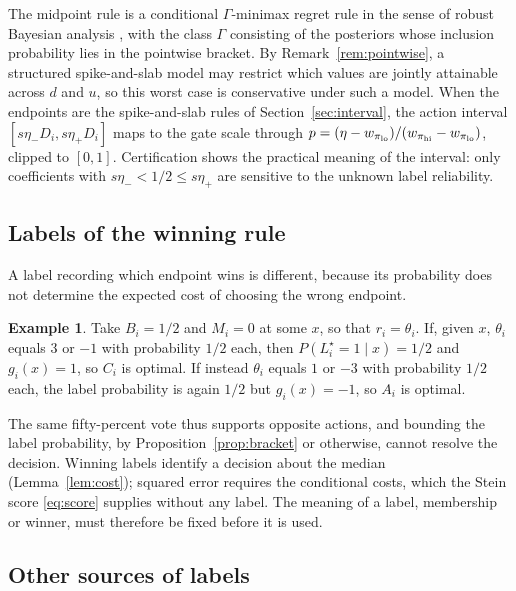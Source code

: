 \documentclass[11pt]{article}
\theoremstyle{plain}
\theoremstyle{definition}
\newtheorem{example}{Example}
\theoremstyle{remark}
\begin{document}
The midpoint rule is a conditional $\Gamma$-minimax regret rule in the sense of robust
Bayesian analysis \citep{berger1985statistical,vidakovic2000gamma}, with the class $\Gamma$
consisting of the posteriors whose inclusion probability lies in the pointwise bracket. By
Remark~\ref{rem:pointwise}, a structured spike-and-slab model may restrict which values are
jointly attainable across $d$ and $u$, so this worst case is conservative under such a model. When the
endpoints are the spike-and-slab rules of Section~\ref{sec:interval}, the action interval
$[s\eta_-D_i,s\eta_+D_i]$ maps to the gate scale through
$p=(\eta-w_{\pi_{\rm lo}})/(w_{\pi_{\rm hi}}-w_{\pi_{\rm lo}})$, clipped to $[0,1]$.
Certification shows the practical meaning of the interval: only coefficients with
$s\eta_-<1/2\le s\eta_+$ are sensitive to the unknown label reliability.

\subsection{Labels of the winning rule}

A label recording which endpoint wins is different, because its probability does not
determine the expected cost of choosing the wrong endpoint.

\begin{example}\label{ex:votes}
Take $B_i=1/2$ and $M_i=0$ at some $x$, so that $r_i=\theta_i$. If, given $x$, $\theta_i$
equals $3$ or $-1$ with probability $1/2$ each, then $P(L_i^\star=1\mid x)=1/2$ and
$g_i(x)=1$, so $C_i$ is optimal. If instead $\theta_i$ equals $1$ or $-3$ with probability
$1/2$ each, the label probability is again $1/2$ but $g_i(x)=-1$, so $A_i$ is optimal.
\end{example}

The same fifty-percent vote thus supports opposite actions, and bounding the label
probability, by Proposition~\ref{prop:bracket} or otherwise, cannot resolve the decision.
Winning labels identify a decision about the median (Lemma~\ref{lem:cost}); squared error
requires the conditional costs, which the Stein score \eqref{eq:score} supplies without any
label. The meaning of a label, membership or winner, must therefore be fixed before it is
used.

\subsection{Other sources of labels}
\end{document}
